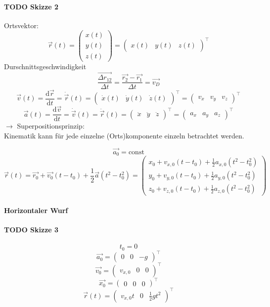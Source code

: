 \documentclass[a4paper]{scrartcl}
\theoremstyle{definition}
\theoremstyle{plain}
\theoremstyle{plain}
\theoremstyle{remark}
\theoremstyle{remark}
\theoremstyle{remark}
\begin{document}
\paragraph{{\bfseries\sffamily TODO} Skizze 2}
\label{sec-2-1-2-1}
Ortsvektor:
\[\vec{r}(t) = \begin{pmatrix} x(t) \\ y(t) \\ z(t) \end{pmatrix} = {\begin{pmatrix} x(t) & y(t) & z(t)\end{pmatrix}}^\intercal\]
Durschnittsgeschwindigkeit
\[\frac{\vec{\Delta r_{12}}}{\Delta t} = \frac{\vec{r_2} - \vec{r_1}}{\Delta t} = \vec{v_D}\]
\[\vec{v}(t) = \frac{\mathrm{d}\vec{r}}{\mathrm{d}t} = \dot{\vec{r}}(t) = {\begin{pmatrix}\dot{x}(t) & \dot{y}(t) & \dot{z}(t)\end{pmatrix}}^\intercal = {\begin{pmatrix} v_x & v_y & v_z\end{pmatrix}}^\intercal\]
\[\vec{a}(t) = \frac{\mathrm{d}\vec{v}}{\mathrm{d}t} = \dot{\vec{v}}(t) = \ddot{\vec{r}}(t) = {\begin{pmatrix} \ddot{x} & \ddot{y} & \ddot{z}\end{pmatrix}}^\intercal = {\begin{pmatrix} a_x & a_y & a_z \end{pmatrix}}^\intercal\]
$\rightarrow$ Superpositionsprinzip: \\
    Kinematik kann für jede einzelne (Orts)komponente einzeln betrachtet werden.

\[\vec{a_0} = \text{const}\]
\[\vec{r}(t) = \vec{r_0} + \vec{v_0}(t-t_0) + \frac{1}{2}\vec{a}(t^2-t_0^2) = \begin{pmatrix} x_0 + v_{x,0}(t-t_0) + \frac{1}{2} a_{x,0}(t^2-t_0^2) \\ y_0 + v_{y,0}(t-t_0) + \frac{1}{2} a_{y,0}(t^2-t_0^2) \\ z_0 + v_{z,0}(t-t_0) + \frac{1}{2} a_{z,0}(t^2-t_0^2) \end{pmatrix}\]
\paragraph{Horizontaler Wurf}
\label{sec-2-1-2-2}
\paragraph{{\bfseries\sffamily TODO} Skizze 3}
\label{sec-2-1-2-3}
\[t_0 = 0\]
\[\vec{a_0} =  {\begin{pmatrix} 0 & 0 & -g \end{pmatrix}}^\intercal\]
\[\vec{v_0} =  {\begin{pmatrix} v_{x,0} & 0 & 0 \end{pmatrix}}^\intercal\]
\[\vec{x_0} =  {\begin{pmatrix} 0 & 0 & 0 \end{pmatrix}}^\intercal\]
\[\vec{r}(t) =  {\begin{pmatrix} v_{x,0}t & 0 & \frac{1}{2}gt^2 \end{pmatrix}}^\intercal\]
\end{document}
